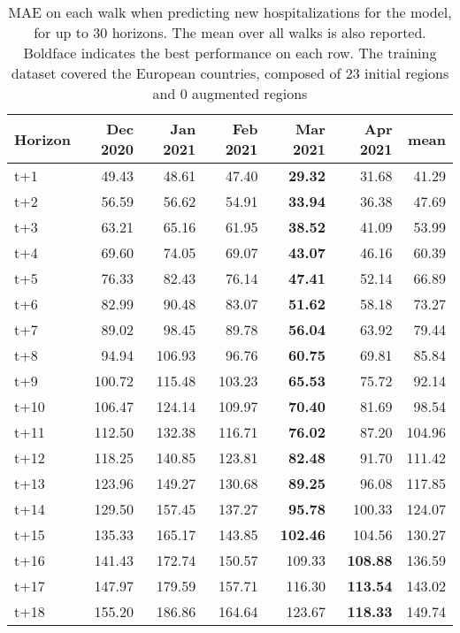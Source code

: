 \begin{table}[H]
\centering
\caption{MAE on each walk when predicting new hospitalizations for the model, for up to 30 horizons. The mean over all walks is also reported. Boldface indicates the best performance on each row. The training dataset covered the European countries, composed of 23 initial regions and 0 augmented regions }
\label{tab:MAE_walk_assembly_0}
\begin{tabular}{lrrrrrr}
\toprule
Horizon &  Dec 2020 &  Jan 2021 &  Feb 2021 &  Mar 2021 &  Apr 2021 &   mean \\
\midrule
t+1  & 49.43  & 48.61  & 47.40  & \textbf{29.32}  & 31.68  & 41.29  \\
t+2  & 56.59  & 56.62  & 54.91  & \textbf{33.94}  & 36.38  & 47.69  \\
t+3  & 63.21  & 65.16  & 61.95  & \textbf{38.52}  & 41.09  & 53.99  \\
t+4  & 69.60  & 74.05  & 69.07  & \textbf{43.07}  & 46.16  & 60.39  \\
t+5  & 76.33  & 82.43  & 76.14  & \textbf{47.41}  & 52.14  & 66.89  \\
t+6  & 82.99  & 90.48  & 83.07  & \textbf{51.62}  & 58.18  & 73.27  \\
t+7  & 89.02  & 98.45  & 89.78  & \textbf{56.04}  & 63.92  & 79.44  \\
t+8  & 94.94  & 106.93  & 96.76  & \textbf{60.75}  & 69.81  & 85.84  \\
t+9  & 100.72  & 115.48  & 103.23  & \textbf{65.53}  & 75.72  & 92.14  \\
t+10  & 106.47  & 124.14  & 109.97  & \textbf{70.40}  & 81.69  & 98.54  \\
t+11  & 112.50  & 132.38  & 116.71  & \textbf{76.02}  & 87.20  & 104.96  \\
t+12  & 118.25  & 140.85  & 123.81  & \textbf{82.48}  & 91.70  & 111.42  \\
t+13  & 123.96  & 149.27  & 130.68  & \textbf{89.25}  & 96.08  & 117.85  \\
t+14  & 129.50  & 157.45  & 137.27  & \textbf{95.78}  & 100.33  & 124.07  \\
t+15  & 135.33  & 165.17  & 143.85  & \textbf{102.46}  & 104.56  & 130.27  \\
t+16  & 141.43  & 172.74  & 150.57  & 109.33  & \textbf{108.88}  & 136.59  \\
t+17  & 147.97  & 179.59  & 157.71  & 116.30  & \textbf{113.54}  & 143.02  \\
t+18  & 155.20  & 186.86  & 164.64  & 123.67  & \textbf{118.33}  & 149.74  \\

\end{tabular}
\end{table}
